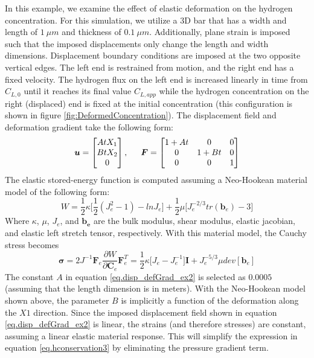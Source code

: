 \documentclass[10pt]{elsarticle}
\begin{document}
In this example, we examine the effect of elastic deformation on the hydrogen concentration.  For this simulation, we utilize a 3D bar that has a width and length of $1 \: \mu m$ and thickness of $0.1 \: \mu m$.  Additionally, plane strain is imposed such that the imposed displacements only change the length and width dimensions.  Displacement boundary conditions are imposed at the two opposite vertical edges.  The left end is restrained from motion, and the right end has a fixed velocity.  The hydrogen flux on the left end is increased linearly in time from $C_{L,0}$ until it reaches its final value $C_{L,app}$ while the hydrogen concentration on the right (displaced) end is fixed at the initial concentration (this configuration is shown in figure \ref{fig:DeformedConcentration}).  The displacement field and deformation gradient take the following form:
\begin{equation}
\label{eq.disp_defGrad_ex2} \boldsymbol{u} = 
\begin{bmatrix}
A t X_1 \\
B t X_2 \\
0 \\
\end{bmatrix}
, \indent
\boldsymbol{F} = 
\begin{bmatrix}
1 + A t & 0 & 0 \\
0 & 1 + B t & 0 \\
0 & 0 & 1 \\
\end{bmatrix}
\end{equation}
The elastic stored-energy function is computed assuming a Neo-Hookean material model of the following form:
\begin{equation}
\label{eq:neoHookeanEnergy}
W = \frac {1} {2} \kappa  \bigg [ \frac {1} {2} (J_e^2 - 1) - ln J_e \bigg ] + \frac {1} {2} \mu \bigg [ J_e^{-2/3} tr(\boldsymbol{b}_e) -3 \bigg]
\end{equation}
Where $\kappa$, $\mu$, $J_e$, and $\boldsymbol{b_e}$ are the bulk modulus, shear modulus, elastic jacobian, and elastic left stretch tensor, respectively.  With this material model, the Cauchy stress becomes
\begin{equation}
\label{eq:neoHookeanStress}
\boldsymbol{\sigma} = 2 J^{-1} \boldsymbol{F}_e \frac {\partial W} {\partial \boldsymbol{C}_e} \boldsymbol{F}_e^T = \frac {1} {2} \kappa \bigg [ J_e - J_e^{-1} \bigg] \boldsymbol{I} + J_e^{-5/3} \mu dev[\boldsymbol{b}_e]
\end{equation}
The constant $A$ in equation \ref{eq.disp_defGrad_ex2} is selected as $0.0005$ (assuming that the length dimension is in meters).  With the Neo-Hookean model shown above, the parameter $B$ is implicitly a function of the deformation along the $X1$ direction.  Since the imposed displacement field shown in equation \ref{eq.disp_defGrad_ex2} is linear, the strains (and therefore stresses) are constant, assuming a linear elastic material response.  This will simplify the expression in equation \ref{eq.hconservation3} by eliminating the pressure gradient term.  
\end{document}
